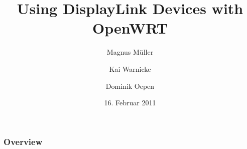 \documentclass{beamer}
\title{Using DisplayLink Devices with OpenWRT}
\institute[{Humboldt-Universität zu Berlin}]{\inst{}Humboldt-Universität zu Berlin}
\author[Magnus Müller \and Kai Warnicke \and Dominik Oepen]{Magnus Müller \and Kai Warnicke \and Dominik Oepen}
\date[16.02.2011]{16. Februar 2011}
\begin{document}
	\begin{frame}
		\titlepage
	\end{frame}

	\begin{frame}
		\frametitle{Overview}
		\tableofcontents
	\end{frame}	
	
\end{document}
